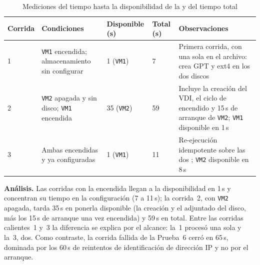 \begin{table}[H]
    \centering
    \caption{Mediciones del tiempo hasta la disponibilidad de la \vm{} y del tiempo total}
    \label{tab:tiempos}
    \begin{tabular}{@{}lp{4.2cm}p{2.5cm}p{2.3cm}p{4.1cm}@{}}
        \toprule
        \textbf{Corrida} & \textbf{Condiciones} & \textbf{Disponible (s)} & \textbf{Total (s)} & \textbf{Observaciones} \\
        \midrule
        1 & \texttt{VM1} encendida; almacenamiento sin configurar & 1 (\texttt{VM1}) & 7 & Primera corrida, con una sola \vm{} en el archivo: crea GPT y ext4 en los dos discos \\
        2 & \texttt{VM2} apagada y sin disco; \texttt{VM1} encendida & 35 (\texttt{VM2}) & 59 & Incluye la creación del VDI, el ciclo de encendido y 15\,s de arranque de \texttt{VM2}; \texttt{VM1} disponible en 1\,s \\
        3 & Ambas \vm{} encendidas y ya configuradas & 1 (\texttt{VM1}) & 11 & Re-ejecución idempotente sobre las dos \vm{}; \texttt{VM2} disponible en 8\,s \\
        \bottomrule
    \end{tabular}
\end{table}

\textbf{Análisis.} Las corridas con la \vm{} encendida llegan a la disponibilidad en 1\,s y concentran su tiempo en la configuración (7 a 11\,s); la corrida~2, con \texttt{VM2} apagada, tarda 35\,s en ponerla disponible (la creación y el adjuntado del disco, más los 15\,s de arranque una vez encendida) y 59\,s en total. Entre las corridas calientes~1 y~3 la diferencia se explica por el alcance: la~1 procesó una sola \vm{} y la~3, dos. Como contraste, la corrida fallida de la Prueba~6 cerró en 65\,s, dominada por los 60\,s de reintentos de identificación de dirección IP y no por el arranque.



